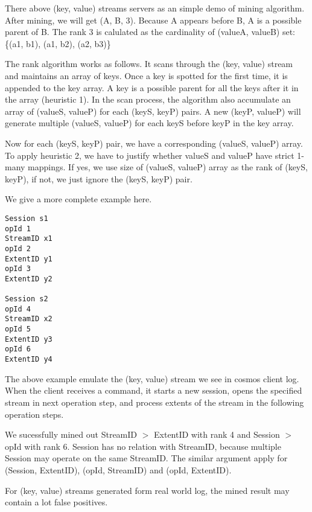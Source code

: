 There above (key, value) streams servers as an simple demo
of mining algorithm. After mining, we will get (A, B, 3).
Because A appears before B, A is a possible parent of B. The
rank 3 is calulated as the cardinality of (valueA, valueB)
set: \{(a1, b1), (a1, b2), (a2, b3)\}

The rank algorithm works as follows. It scans through the
(key, value) stream and maintains an array of keys. Once a
key is spotted for the first time, it is appended to the key
array. A key is a possible parent for all the keys after it
in the array (heuristic 1). In the scan process, the algorithm also
accumulate an array of (valueS, valueP) for each (keyS, keyP)
pairs. A new (keyP, valueP) will generate multiple (valueS,
valueP) for each keyS before keyP in the key array.

Now for each (keyS, keyP) pair, we have a corresponding
(valueS, valueP) array. To apply heuristic 2, we have to
justify whether valueS and valueP have strict 1-many
mappings. If yes, we use size of (valueS, valueP) array
as the rank of (keyS, keyP), if not, we just ignore the
(keyS, keyP) pair.


We give a more complete example here.
\begin{verbatim}
Session s1
opId 1
StreamID x1
opId 2
ExtentID y1
opId 3
ExtentID y2

Session s2
opId 4
StreamID x2
opId 5
ExtentID y3
opId 6
ExtentID y4
\end{verbatim}
The above example emulate the (key, value) stream we see in
cosmos client log. When the client receives a command, it
starts a new session, opens the specified stream in next
operation step, and process extents of the stream in the
following operation steps.

We sucessfully mined out StreamID $>$ ExtentID with rank 4
and Session $>$ opId with rank 6. Session has no relation
with StreamID, because multiple Session may operate on the
same StreamID. The similar argument apply for (Session,
ExtentID), (opId, StreamID) and (opId, ExtentID).

For (key, value) streams generated form real world log, the
mined result may contain a lot false positives.


